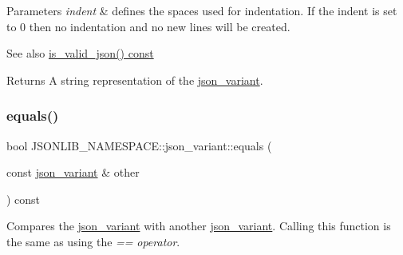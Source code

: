 \begin{DoxyParams}{Parameters}
{\em indent} & defines the spaces used for indentation. If the indent is set to 0 then no indentation and no new lines will be created. \\
\hline
\end{DoxyParams}
\begin{DoxySeeAlso}{See also}
\hyperlink{classJSONLIB__NAMESPACE_1_1json__variant_a158e3148d9256af3d1b8251b2ca7b6c4}{is\+\_\+valid\+\_\+json() const} 
\end{DoxySeeAlso}
\begin{DoxyReturn}{Returns}
A string representation of the \hyperlink{classJSONLIB__NAMESPACE_1_1json__variant}{json\+\_\+variant}. 
\end{DoxyReturn}
\mbox{\label{classJSONLIB__NAMESPACE_1_1json__variant_ae68b9cb156c2b2f9e12c7f889634b63a}} 
\subsubsection{\texorpdfstring{equals()}{equals()}\hspace{0.1cm}{\footnotesize\ttfamily [1/2]}}
{\footnotesize\ttfamily bool J\+S\+O\+N\+L\+I\+B\+\_\+\+N\+A\+M\+E\+S\+P\+A\+C\+E\+::json\+\_\+variant\+::equals (\begin{DoxyParamCaption}\item[{const \hyperlink{classJSONLIB__NAMESPACE_1_1json__variant}{json\+\_\+variant} \&}]{other }\end{DoxyParamCaption}) const}



Compares the \hyperlink{classJSONLIB__NAMESPACE_1_1json__variant}{json\+\_\+variant} with another \hyperlink{classJSONLIB__NAMESPACE_1_1json__variant}{json\+\_\+variant}. Calling this function is the same as using the {\itshape ==} {\itshape operator}. 


